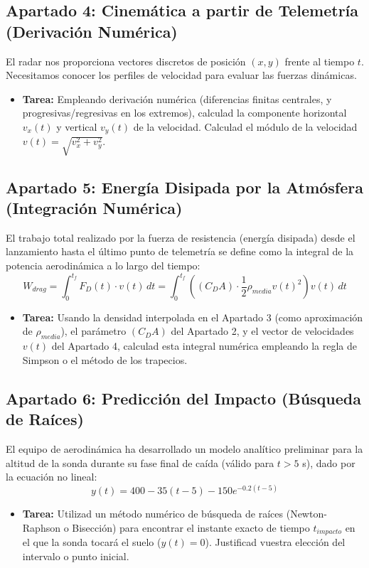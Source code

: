 	\subsection*{Apartado 4: Cinemática a partir de Telemetría (Derivación Numérica)}
	El radar nos proporciona vectores discretos de posición $(x, y)$ frente al tiempo $t$. Necesitamos conocer los perfiles de velocidad para evaluar las fuerzas dinámicas.
	\begin{itemize}
		\item \textbf{Tarea:} Empleando derivación numérica (diferencias finitas centrales, y progresivas/regresivas en los extremos), calculad la componente horizontal $v_x(t)$ y vertical $v_y(t)$ de la velocidad. Calculad el módulo de la velocidad $v(t) = \sqrt{v_x^2 + v_y^2}$. 
	\end{itemize}
	
	\subsection*{Apartado 5: Energía Disipada por la Atmósfera (Integración Numérica)}
	El trabajo total realizado por la fuerza de resistencia (energía disipada) desde el lanzamiento hasta el último punto de telemetría se define como la integral de la potencia aerodinámica a lo largo del tiempo:
	$$ W_{drag} = \int_{0}^{t_f} F_D(t) \cdot v(t) \, dt = \int_{0}^{t_f} \left( (C_D A) \cdot \frac{1}{2} \rho_{media} v(t)^2 \right) v(t) \, dt $$
	\begin{itemize}
		\item \textbf{Tarea:} Usando la densidad interpolada 
		en el Apartado 3 (como aproximación de $\rho_{media}$), 
		el parámetro $(C_D A)$ del Apartado 2, 
		y el vector de velocidades $v(t)$ del Apartado 4, 
		calculad esta integral numérica empleando 
		la regla de Simpson o el método de los trapecios. 
		
	\end{itemize}
	
	\subsection*{Apartado 6: Predicción del Impacto (Búsqueda de Raíces)}
	El equipo de aerodinámica ha desarrollado un modelo analítico preliminar para la altitud de la sonda durante su fase final de caída (válido para $t > 5$ s), dado por la ecuación no lineal:
	$$ y(t) = 400 - 35 (t - 5) - 150 e^{-0.2 (t - 5)} $$
	\begin{itemize}
		\item \textbf{Tarea:} Utilizad un método numérico 
		de búsqueda de raíces (Newton-Raphson o Bisección) 
		para encontrar el instante exacto de tiempo $t_{impacto}$ 
		en el que la sonda tocará el suelo ($y(t) = 0$). 
		Justificad vuestra elección del intervalo o punto inicial.
	\end{itemize}
	
